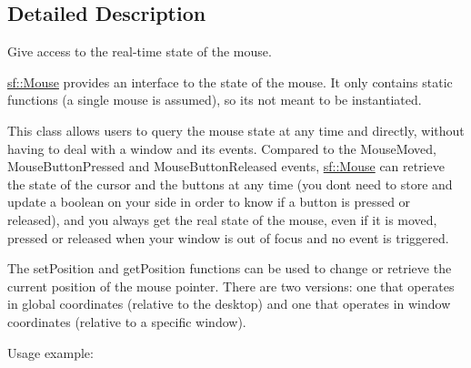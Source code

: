\subsection{Detailed Description}
Give access to the real-\/time state of the mouse. 

\begin{DoxyVerb}\end{DoxyVerb}


\mbox{\hyperlink{classsf_1_1_mouse}{sf\+::\+Mouse}} provides an interface to the state of the mouse. It only contains static functions (a single mouse is assumed), so it\textquotesingle{}s not meant to be instantiated.

This class allows users to query the mouse state at any time and directly, without having to deal with a window and its events. Compared to the Mouse\+Moved, Mouse\+Button\+Pressed and Mouse\+Button\+Released events, \mbox{\hyperlink{classsf_1_1_mouse}{sf\+::\+Mouse}} can retrieve the state of the cursor and the buttons at any time (you don\textquotesingle{}t need to store and update a boolean on your side in order to know if a button is pressed or released), and you always get the real state of the mouse, even if it is moved, pressed or released when your window is out of focus and no event is triggered.

The set\+Position and get\+Position functions can be used to change or retrieve the current position of the mouse pointer. There are two versions\+: one that operates in global coordinates (relative to the desktop) and one that operates in window coordinates (relative to a specific window).

Usage example\+: 
\begin{DoxyCode}{0}
\DoxyCodeLine{\{}
\DoxyCodeLine{    \textcolor{comment}{// left click...}}
\DoxyCodeLine{\}}
\DoxyCodeLine{}
\DoxyCodeLine{\textcolor{comment}{// get global mouse position}}
\DoxyCodeLine{}
\DoxyCodeLine{\textcolor{comment}{// set mouse position relative to a window}}
\end{DoxyCode}


